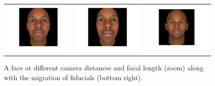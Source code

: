 \documentclass[runningheads]{llncs}
\begin{document}
\begin{figure}[ht]
\begin{tabular}{ccc}
\includegraphics[width=.3\linewidth]{resources/figures/extracted_fiducial_0005.png} &
\includegraphics[width=.3\linewidth]{resources/figures/extracted_fiducial_0007.png} &
\includegraphics[width=.3\linewidth]{resources/figures/fiducial_migration.png}
\end{tabular}
\caption{A face at different camera distances and focal length (zoom) along with the migration of fiducials (bottom right).}
\label{fig:fiducial_migration}
\end{figure}
\end{document}
